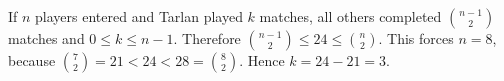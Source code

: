If $n$ players entered and Tarlan played $k$ matches, all others completed $\binom{n-1}{2}$ matches and $0\le k\le n-1$. Therefore $\binom{n-1}{2}\le24\le\binom n2$. This forces $n=8$, because $\binom72=21<24<28=\binom82$. Hence $k=24-21=\boxed3$.
